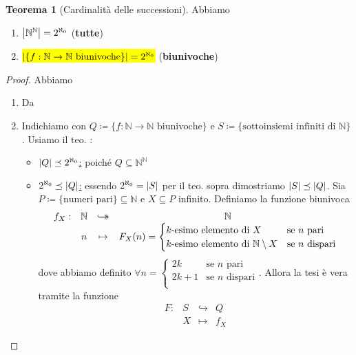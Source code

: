 \documentclass[a4paper,10pt]{article}
\theoremstyle{definition}
\newcommand{\na}{\mathbb{N}} %
\newcommand{\hookdoubleheadrightarrow}{\hookrightarrow\mathrel{\mspace{-15mu}}\rightarrow}
\newcommand{\bij}{\hookdoubleheadrightarrow} %
\theoremstyle{indentdefinition}
\theoremstyle{indentpostulate}
\theoremstyle{indenttheorem}
\newtheorem{thm}{Teorema}[section]
\theoremstyle{myremark}
\theoremstyle{indentgeneral}
\newenvironment{myboxed} 
{\noindent\begin{lrbox}{\mybox}\begin{minipage}{\textwidth}}
{\end{minipage}\end{lrbox}\fbox{\usebox{\mybox}}}
\begin{document}
\begin{myboxed}
\begin{thm}[Cardinalità delle successioni] Abbiamo
\begin{enumerate}
    \item  $\abs{\na^\na}=2^{\aleph_0}$ (\textbf{tutte})
    \item \hl{$\abs{\{f:\na\to\na \text{ biunivoche}\}}=2^{\aleph_0}$} (\textbf{biunivoche})
\end{enumerate}
\end{thm}
\end{myboxed}
\begin{proof}
    Abbiamo
    \begin{enumerate}
        \item Da 
        \item Indichiamo con $Q\coloneqq\{f:\na\to\na \text{ biunivoche}\}$ e $S\coloneqq\{\text{sottoinsiemi infiniti di $\na$}\}$. Usiamo il teo. :
        \begin{itemize}
            \item \underline{$\abs{Q}\preceq2^{\aleph_0}$:} poiché $Q\subseteq \na^\na$
            \item \underline{$2^{\aleph_0}\preceq\abs{Q}$:} essendo  $2^{\aleph_0}=\abs{S}$ per il teo. sopra dimostriamo $\abs{S}\preceq\abs{Q}$. Sia $P\coloneqq\{\text{numeri pari}\}\subseteq\na$ e $X\subseteq P$ infinito. Definiamo la funzione biunivoca
            $$\begin{array}{cccc}
   f_X:& \na & \bij & \na  \\
    & n & \mapsto & F_X(n)=\begin{cases}
         k\text{-esimo elemento di $X$} & \text{se $n$ pari}\\
         k\text{-esimo elemento di $\na\setminus X$} & \text{se $n$ dispari}
     \end{cases}
\end{array}$$
dove abbiamo definito $\forall n=\begin{cases}
                2k & \text{se $n$ pari}\\
                2k+1 & \text{se $n$ dispari}\\
            \end{cases}$. Allora la tesi è vera tramite la funzione
            $$\begin{array}{cccc}
   F: & S & \hookrightarrow & Q  \\
    & X & \mapsto & f_X
\end{array}$$
        \end{itemize}
    \end{enumerate}
\end{proof}
\end{document}

